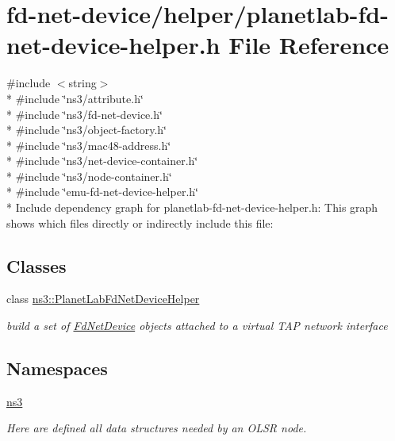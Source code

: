 \hypertarget{planetlab-fd-net-device-helper_8h}{}\section{fd-\/net-\/device/helper/planetlab-\/fd-\/net-\/device-\/helper.h File Reference}
\label{planetlab-fd-net-device-helper_8h}
{\ttfamily \#include $<$string$>$}\\*
{\ttfamily \#include \char`\"{}ns3/attribute.\+h\char`\"{}}\\*
{\ttfamily \#include \char`\"{}ns3/fd-\/net-\/device.\+h\char`\"{}}\\*
{\ttfamily \#include \char`\"{}ns3/object-\/factory.\+h\char`\"{}}\\*
{\ttfamily \#include \char`\"{}ns3/mac48-\/address.\+h\char`\"{}}\\*
{\ttfamily \#include \char`\"{}ns3/net-\/device-\/container.\+h\char`\"{}}\\*
{\ttfamily \#include \char`\"{}ns3/node-\/container.\+h\char`\"{}}\\*
{\ttfamily \#include \char`\"{}emu-\/fd-\/net-\/device-\/helper.\+h\char`\"{}}\\*
Include dependency graph for planetlab-\/fd-\/net-\/device-\/helper.h\+:
This graph shows which files directly or indirectly include this file\+:
\subsection*{Classes}
\begin{DoxyCompactItemize}
\item 
class \hyperlink{classns3_1_1PlanetLabFdNetDeviceHelper}{ns3\+::\+Planet\+Lab\+Fd\+Net\+Device\+Helper}
\begin{DoxyCompactList}\small\item\em build a set of \hyperlink{classns3_1_1FdNetDevice}{Fd\+Net\+Device} objects attached to a virtual T\+AP network interface \end{DoxyCompactList}\end{DoxyCompactItemize}
\subsection*{Namespaces}
\begin{DoxyCompactItemize}
\item 
 \hyperlink{namespacens3}{ns3}
\begin{DoxyCompactList}\small\item\em Here are defined all data structures needed by an O\+L\+SR node. \end{DoxyCompactList}\end{DoxyCompactItemize}
